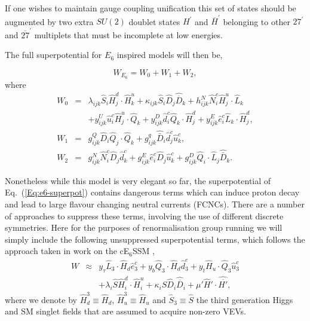 \documentclass[preprint,amsmath,amssymb,aps,superscriptaddress,prd,showpacs,floatfix,nofootinbib]{revtex4-1}
\newcommand{\be}{\begin{equation}}
\newcommand{\ee}{\end{equation}}
\newcommand{\ba}{\begin{eqnarray}}
\newcommand{\ea}{\end{eqnarray}}
\newcommand{\SuperField}[1]{\hat{#1}}
\begin{document}
If one wishes to maintain gauge coupling unification this set of
states should be augmented by two extra $SU(2)$ doublet states
$H^\prime$ and $\overline{H}^\prime$ belonging to other $27^\prime$
and $\overline{27}^\prime$ multiplets that must be incomplete at low
energies.

The full superpotential for $E_6$ inspired models will then be,

\be
W_{E_6} = W_0 + W_1 + W_2,
\label{Eq:e6-superpot}
\ee where
\begin{eqnarray}
W_0 &=& \lambda_{ijk} \hat{S}_i  \hat{H}^d_{j} \cdot\hat{H}^u_{k} + \kappa_{ijk} \hat{S}_i \hat{D}_j \hat{\overline{D}}_k + h^N_{ijk} \hat{N}^c_i  \hat{H}^u_{j} \cdot \hat{L}_k \nonumber \\
& & + y^U_{ijk} \hat{u}^c_i  \hat{H}^u_{j} \cdot \hat{Q}_k + y^D_{ijk} \hat{d}^c_i  \hat{Q}_k\cdot\hat{H}^d_{j}  + y^E_{ijk} \hat{e}^c_i  \hat{L}_k\cdot\hat{H}^d_{j} , \\
W_1 &=& g^Q_{ijk} \hat{D}_i  \hat{Q}_j \cdot \hat{Q}_k + g^q_{ijk} \hat{\bar{D}}_i \hat{d}^c_j \hat{u}^c_k, \\
W_2 &=& g^N_{ijk} \hat{N}^c_i \hat{D}_j \hat{d}^c_k + g^E_{ijk} \hat{e}^c_i \hat{D}_j \hat{u}^c_k + g^D_{ijk}  \hat{Q}_i \cdot \hat{L}_j \hat{\bar{D}}_k.
\label{Eq:e6-superpot-parts}
\end{eqnarray}

Nonetheless while this model is very elegant so far, the
superpotential of Eq.~(\ref{Eq:e6-superpot}) contains dangerous terms which
can induce proton decay and lead to large flavour changing neutral
currents (FCNCs).  There are a number of approaches to suppress these
terms, involving the use of different discrete symmetries.  Here for
the purposes of renormalisation group running we will simply include
the following unsuppressed superpotential terms, which follows the
approach taken in work on the cE$_6$SSM \cite{Athron:2009ue,
  Athron:2009bs},
%
    \ba
    W &\approx& y_{\tau} \SuperField{L}_3 \cdot \SuperField{H}_d
      \SuperField{e}^c_3 + y_b \SuperField{Q}_3\cdot\SuperField{H}_d
      \SuperField{d}_3^c + y_t \SuperField{H}_u\cdot\SuperField{Q}_3
      \SuperField{u}_3^c\nonumber\\
    &&
    + \lambda_i \SuperField{S} \SuperField{H}_i^d
    \cdot \SuperField{H}_i^u  + \kappa_i \SuperField{S} \SuperField{D}_i
    \SuperField{\overline{D}}_i + \mu' \SuperField{H}'\cdot
    \SuperField{\overline{H'}},
    \ea
  \label{SuPot_RGE}
%  
where we denote by $\SuperField{H}_d^3\equiv \SuperField{H}_d$,
$\SuperField{H}_u^3\equiv\SuperField{H}_u$ and $\SuperField{S}_3\equiv\SuperField{S}$ the third generation Higgs and SM singlet fields that are assumed to acquire non-zero VEVs.
\end{document}
